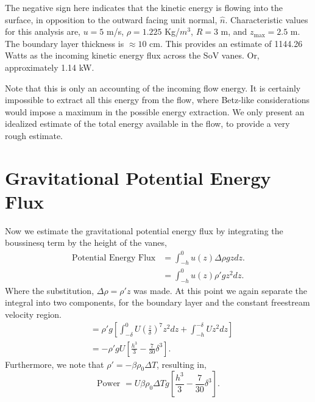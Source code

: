 \documentclass{article}
\begin{document}

The negative sign here indicates that the kinetic energy is flowing into
the surface, in opposition to the outward facing unit normal, $\hat
n$. Characteristic values for this analysis are, $u = 5$ m/s, $\rho =
1.225$ Kg/$m^3$, $R = 3$ m, and $z_{\text{max}} = 2.5$ m. The boundary
layer thickness is $\approx 10$ cm. This provides
an estimate of 1144.26 Watts as the incoming kinetic energy flux across
the SoV vanes. Or, approximately 1.14 kW. 

Note that this is only an accounting of the incoming flow energy. It is certainly
impossible to extract all this energy from the flow, where Betz-like considerations 
would impose a maximum in the possible energy extraction. We only present an idealized
estimate of the total energy available in the flow, to provide a very rough estimate.

\section*{Gravitational Potential Energy Flux}


Now we estimate the gravitational potential energy flux by integrating 
the boussinesq term by the height of the vanes, 
\begin{align*}
  \text{Potential Energy Flux} & = \int_{-h}^0 u(z) \Delta \rho g z dz. \\
  & = \int_{-h}^0 u(z) \rho' g z^2 dz. 
\end{align*}
Where the substitution, $\Delta \rho = \rho' z$ was made. At 
this point we again separate the integral into two components, 
for the boundary layer and the constant freestream velocity region. 
\begin{align*}
  & = \rho' g \left[ \int_{-\delta}^{0} U \left( \frac{z}{\delta} \right)^7 z^2 dz 
      + \int_{-h}^{-\delta} U z^2 dz \right] \\
  & = -\rho' g U \left[ \frac{h^3}{3} - \frac{7}{30} \delta^3 \right].
\end{align*}
Furthermore, we
note that $\rho' = -\beta \rho_0 \Delta T$, resulting in, 
%
%
\begin{equation}
 \text{Power } = U \beta \rho_0 \Delta T g \left[ \frac{h^3}{3} - \frac{7}{30} \delta^3 \right].
\end{equation}
\end{document}
